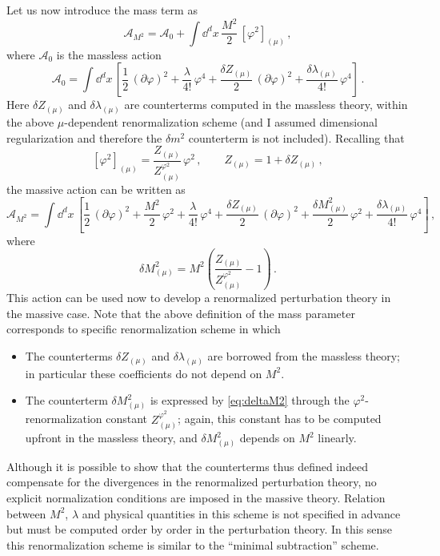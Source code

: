 Let us now introduce the mass term as
\[
\mathcal A_{M^2}=\mathcal A_0+\int \dd^dx\,\frac{M^2}2\,[\varphi^2]_{(\mu)}\,,
\]
where $\mathcal A_0$ is the massless action
\[
\mathcal A_0=\int \dd^dx\,\left[\frac12\,(\partial\varphi)^2+\frac\lambda{4!}\,\varphi^4+\frac{\delta Z_{(\mu)}}2\,(\partial\varphi)^2+\frac{\delta\lambda_{(\mu)}}{4!}\,\varphi^4\right]\,.
\]
Here $\delta Z_{(\mu)}$ and $\delta\lambda_{(\mu)}$ are counterterms computed in the
massless theory, within the above $\mu$-dependent renormalization scheme (and I
assumed dimensional regularization and therefore the $\delta m^2$ counterterm is
not included). Recalling that
\[
[\varphi^2]_{(\mu)}=\frac{Z_{(\mu)}}{Z^{\varphi^2}_{(\mu)}}\,\varphi^2\,,\qquad Z_{(\mu)}=1+\delta Z_{(\mu)}\,,
\]
the massive action can be written as
\[
\mathcal A_{M^2}=\int \dd^dx\,\left[\frac12\,(\partial\varphi)^2+\frac{M^2}2\,\varphi^2+\frac\lambda{4!}\,\varphi^4+\frac{\delta Z_{(\mu)}}2\,(\partial\varphi)^2+\frac{\delta M^2_{(\mu)}}2\,\varphi^2+\frac{\delta\lambda_{(\mu)}}{4!}\,\varphi^4\right]\,,
\]
where
\begin{equation}\label{eq:deltaM2}
\delta M^2_{(\mu)}=M^2\left(\frac{Z_{(\mu)}}{Z^{\varphi^2}_{(\mu)}}-1\right)\,.
\end{equation}
This action can be used now to develop a renormalized perturbation theory in the
massive case. Note that the above definition of the mass parameter corresponds to
specific renormalization scheme in which
\begin{itemize}
\item The counterterms $\delta Z_{(\mu)}$ and $\delta\lambda_{(\mu)}$ are borrowed
from the massless theory; in particular these coefficients do not depend on $M^2$.
\item The counterterm $\delta M^2_{(\mu)}$ is expressed by \eqref{eq:deltaM2}
through the $\varphi^2$-renormalization constant $Z^{\varphi^2}_{(\mu)}$; again,
this constant has to be computed upfront in the massless theory, and
$\delta M^2_{(\mu)}$ depends on $M^2$ linearly.
\end{itemize}
Although it is possible to show that the counterterms thus defined indeed
compensate for the divergences in the renormalized perturbation theory, no
explicit normalization conditions are imposed in the massive theory. Relation
between $M^2$, $\lambda$ and physical quantities in this scheme is not specified
in advance but must be computed order by order in the perturbation theory. In
this sense this renormalization scheme is similar to the ``minimal subtraction''
scheme.

